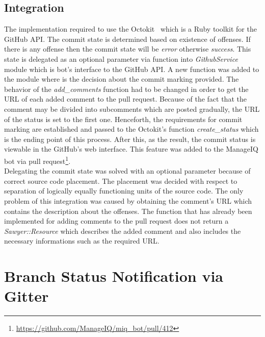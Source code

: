 \subsection{Integration}

The implementation required to use the Octokit~\cite{OCTOKIT} which is a Ruby toolkit for the GitHub API. The commit state is determined based on existence of offenses. If there is any offense then the commit state will be \textit{error} otherwise \textit{success}. This state is delegated as an optional parameter via function into \textit{GithubService} module which is bot's interface to the GitHub API. A new function was added to the module where is the decision about the commit marking provided. The behavior of the \textit{add\_comments} function had to be changed in order to get the URL of each added comment to the pull request. Because of the fact that the comment may be divided into subcomments which are posted gradually, the URL of the status is set to the first one. Henceforth, the requirements for commit marking are established and passed to the Octokit's function \textit{create\_status} which is the ending point of this process. After this, as the result, the commit status is viewable in the GitHub's web interface. This feature was added to the ManageIQ bot via pull request\footnote{\url{https://github.com/ManageIQ/miq_bot/pull/412}}.\\

Delegating the commit state was solved with an optional parameter because of correct source code placement. The placement was decided with respect to separation of logically equally functioning units of the source code. The only problem of this integration was caused by obtaining the comment's URL which contains the description about the offenses. The function that has already been implemented for adding comments to the pull request does not return a \textit{Sawyer::Resource} which describes the added comment and also includes the necessary informations such as the required URL.

\section{Branch Status Notification via Gitter}

